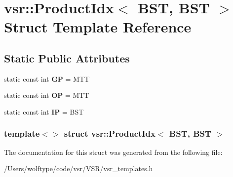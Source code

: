 \hypertarget{structvsr_1_1_product_idx_3_01_b_s_t_00_01_b_s_t_01_4}{\section{vsr\-:\-:Product\-Idx$<$ B\-S\-T, B\-S\-T $>$ Struct Template Reference}
\label{structvsr_1_1_product_idx_3_01_b_s_t_00_01_b_s_t_01_4}
}
\subsection*{Static Public Attributes}
\begin{DoxyCompactItemize}
\item 
\hypertarget{structvsr_1_1_product_idx_3_01_b_s_t_00_01_b_s_t_01_4_a746408842bdb07bf82c564de83428d5e}{static const int {\bfseries G\-P} = M\-T\-T}\label{structvsr_1_1_product_idx_3_01_b_s_t_00_01_b_s_t_01_4_a746408842bdb07bf82c564de83428d5e}

\item 
\hypertarget{structvsr_1_1_product_idx_3_01_b_s_t_00_01_b_s_t_01_4_a568c628b61d2acd25ee9db3e6b7eee14}{static const int {\bfseries O\-P} = M\-T\-T}\label{structvsr_1_1_product_idx_3_01_b_s_t_00_01_b_s_t_01_4_a568c628b61d2acd25ee9db3e6b7eee14}

\item 
\hypertarget{structvsr_1_1_product_idx_3_01_b_s_t_00_01_b_s_t_01_4_a1f2972a01e612f3d4d23fe12b9b9aefc}{static const int {\bfseries I\-P} = B\-S\-T}\label{structvsr_1_1_product_idx_3_01_b_s_t_00_01_b_s_t_01_4_a1f2972a01e612f3d4d23fe12b9b9aefc}

\end{DoxyCompactItemize}
\subsubsection*{template$<$$>$ struct vsr\-::\-Product\-Idx$<$ B\-S\-T, B\-S\-T $>$}



The documentation for this struct was generated from the following file\-:\begin{DoxyCompactItemize}
\item 
/\-Users/wolftype/code/vsr/\-V\-S\-R/vsr\-\_\-templates.\-h\end{DoxyCompactItemize}
